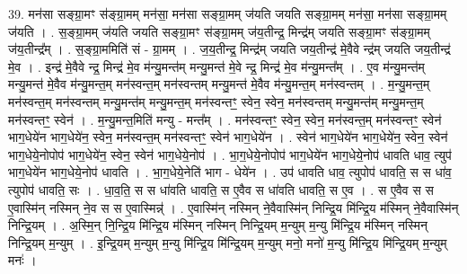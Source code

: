 \documentclass[17pt]{extarticle}
\begin{document}
39. मन॑सा सङ्ग्रा॒मꣳ स॑ङ्ग्रा॒मम् मन॑सा॒ मन॑सा सङ्ग्रा॒मम् ज॑यति जयति सङ्ग्रा॒मम् मन॑सा॒ मन॑सा सङ्ग्रा॒मम् ज॑यति । . स॒ङ्ग्रा॒मम् ज॑यति जयति सङ्ग्रा॒मꣳ स॑ङ्ग्रा॒मम् ज॑य॒तीन्द्र॒ मिन्द्र॑म् जयति सङ्ग्रा॒मꣳ स॑ङ्ग्रा॒मम् ज॑य॒तीन्द्र᳚म् । . स॒ङ्ग्रा॒ममिति॑ सं - ग्रा॒मम् । . ज॒य॒तीन्द्र॒ मिन्द्र॑म् जयति जय॒तीन्द्र॑ मे॒वैवे न्द्र॑म् जयति जय॒तीन्द्र॑ मे॒व । . इन्द्र॑ मे॒वैवे न्द्र॒ मिन्द्र॑ मे॒व म॑न्यु॒मन्त॑म् मन्यु॒मन्त॑ मे॒वे न्द्र॒ मिन्द्र॑ मे॒व म॑न्यु॒मन्त᳚म् । . ए॒व म॑न्यु॒मन्त॑म् मन्यु॒मन्त॑ मे॒वैव म॑न्यु॒मन्त॒म् मन॑स्वन्त॒म् मन॑स्वन्तम् मन्यु॒मन्त॑ मे॒वैव म॑न्यु॒मन्त॒म् मन॑स्वन्तम् । . म॒न्यु॒मन्त॒म् मन॑स्वन्त॒म् मन॑स्वन्तम् मन्यु॒मन्त॑म् मन्यु॒मन्त॒म् मन॑स्वन्तꣳ॒॒ स्वेन॒ स्वेन॒ मन॑स्वन्तम् मन्यु॒मन्त॑म् मन्यु॒मन्त॒म् मन॑स्वन्तꣳ॒॒ स्वेन॑ । . म॒न्यु॒मन्त॒मिति॑ मन्यु - मन्त᳚म् । . मन॑स्वन्तꣳ॒॒ स्वेन॒ स्वेन॒ मन॑स्वन्त॒म् मन॑स्वन्तꣳ॒॒ स्वेन॑ भाग॒धेये॑न भाग॒धेये॑न॒ स्वेन॒ मन॑स्वन्त॒म् मन॑स्वन्तꣳ॒॒ स्वेन॑ भाग॒धेये॑न । . स्वेन॑ भाग॒धेये॑न भाग॒धेये॑न॒ स्वेन॒ स्वेन॑ भाग॒धेये॒नोपोप॑ भाग॒धेये॑न॒ स्वेन॒ स्वेन॑ भाग॒धेये॒नोप॑ । . भा॒ग॒धेये॒नोपोप॑ भाग॒धेये॑न भाग॒धेये॒नोप॑ धावति धाव॒ त्युप॑ भाग॒धेये॑न भाग॒धेये॒नोप॑ धावति । . भा॒ग॒धेये॒नेति॑ भाग - धेये॑न । . उप॑ धावति धाव॒ त्युपोप॑ धावति॒ स स धा॑व॒ त्युपोप॑ धावति॒ सः । . धा॒व॒ति॒ स स धा॑वति धावति॒ स ए॒वैव स धा॑वति धावति॒ स ए॒व । . स ए॒वैव स स ए॒वास्मि॑न् नस्मिन् ने॒व स स ए॒वास्मिन्न्॑ । . ए॒वास्मि॑न् नस्मिन् ने॒वैवास्मि॑न् निन्द्रि॒य मि॑न्द्रि॒य म॑स्मिन् ने॒वैवास्मि॑न् निन्द्रि॒यम् । . अ॒स्मि॒न् नि॒न्द्रि॒य मि॑न्द्रि॒य म॑स्मिन् नस्मिन् निन्द्रि॒यम् म॒न्युम् म॒न्यु मि॑न्द्रि॒य म॑स्मिन् नस्मिन् निन्द्रि॒यम् म॒न्युम् । . इ॒न्द्रि॒यम् म॒न्युम् म॒न्यु मि॑न्द्रि॒य मि॑न्द्रि॒यम् म॒न्युम् मनो॒ मनो॑ म॒न्यु मि॑न्द्रि॒य मि॑न्द्रि॒यम् म॒न्युम् मनः॑ । \newline
\end{document}
